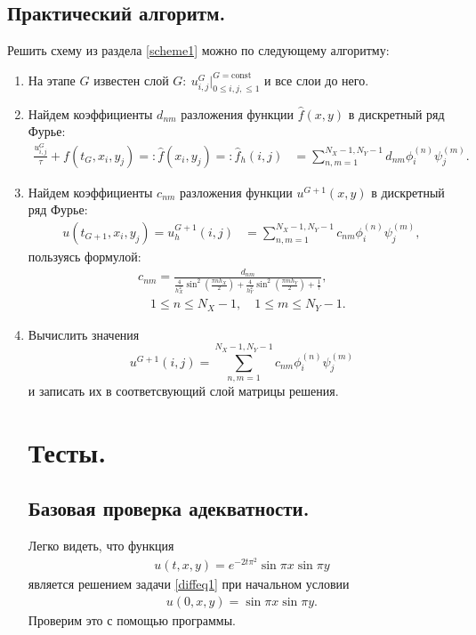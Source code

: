 \documentclass[14pt,a4paper]{extarticle}
\newcommand{\1}{\mathbbm{1}}
\begin{document}
\subsection{Практический алгоритм.}
Решить схему из раздела \ref{scheme1} можно по следующему алгоритму:
\begin{enumerate}
    \item На этапе $G$ известен слой $G: \ u_{i, j}^{G} \big|^{G = \text{const}} _{0 \leq i, j, \leq 1}$ и все слои до него.
    \item Найдем коэффициенты $d_{nm}$ разложения функции $\hat f(x, y)$ в дискретный ряд Фурье: 
    \begin{align*}
     \frac{u^{G}_{i, j}}{\tau} + f(t_G, x_i, y_j) =: \hat f(x_i, y_j) =: \hat f_h(i, j) &= \sum_{n, m = 1}^{N_X-1, N_Y-1} d_{nm} \phi ^{(n)}_i \psi ^{(m)}_j.
    \end{align*}
    \item Найдем коэффициенты $c_{nm}$ разложения функции $u^{G+1}(x, y)$ в дискретный ряд Фурье: 
    \begin{align*}
    u(t_{G+1}, x_i, y_j) = u_h^{G+1}(i, j) &= \sum_{n, m = 1}^{N_X-1, N_Y-1} c_{nm} \phi ^{(n)}_i \psi ^{(m)}_j,
    \end{align*}
    пользуясь формулой:
    \begin{align*}
    c_{nm} = \frac{d_{nm}}{\frac{4}{h_X^2} \sin ^2\left(\frac{\pi n h_X}{2}\right)
    +  \frac{4}{h_Y^2} \sin ^2\left(\frac{\pi m h_Y}{2}\right) + \frac{1}{\tau}}, \\
    \quad 1 \leq n \leq N_X-1, \quad 1 \leq m \leq N_Y-1.
    \end{align*}
    \item Вычислить значения 
    $$
    u^{G+1}(i, j) = \sum_{n, m = 1}^{N_X-1, N_Y-1} c_{nm} \phi ^{(n)}_i \psi ^{(m)}_j
    $$ 
    и записать их в соответсвующий слой матрицы решения.

\section{Тесты.}
\subsection{Базовая проверка адекватности.}
Легко видеть, что функция
 \begin{align*}
     u(t, x, y) = e^{-2t\pi^2} \sin \pi x \sin \pi y
 \end{align*}
 является решением задачи \ref{diffeq1} при начальном условии
  \begin{align*}
     u(0, x, y) = \sin \pi x \sin \pi y.
 \end{align*}
 Проверим это с помощью программы.
\end{enumerate}
\end{document}
